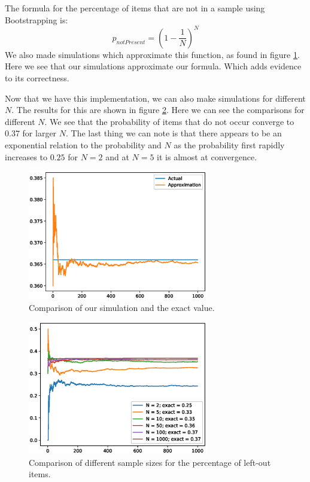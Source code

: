 \documentclass[11pt]{article}
\begin{document}
\section{}
The formula for the percentage of items that are not in a sample using Bootstrapping is:
\[
	p_{notPresent} = (1 - \frac{1}{N})^N
\]
We also made simulations which approximate this function, as found in figure \ref{fig:approx_vs_real}. Here we see that our simulations approximate our formula. Which adds evidence to its correctness.

Now that we have this implementation, we can also make simulations for different $N$. The results for this are shown in figure \ref{fig:leftout}. Here we can see the comparisons for different $N$. We see that the probability of items that do not occur converge to $0.37$ for larger $N$. The last thing we can note is that there appears to be an exponential relation to the probability and $N$ as the probability first rapidly increases to $0.25$ for $N = 2$ and at $N=5$ it is almost at convergence.

\begin{figure}[H]
	\centering
	\includegraphics[width=0.7\textwidth]{images/approx_vs_real.eps}
	\caption{Comparison of our simulation and the exact value.}
	\label{fig:approx_vs_real}
\end{figure}

\begin{figure}[H]
	\centering
	\includegraphics[width=0.7\textwidth]{images/different_sample_sizes.eps}
	\caption{Comparison of different sample sizes for the percentage of left-out items.}
	\label{fig:leftout}
\end{figure}
\end{document}
